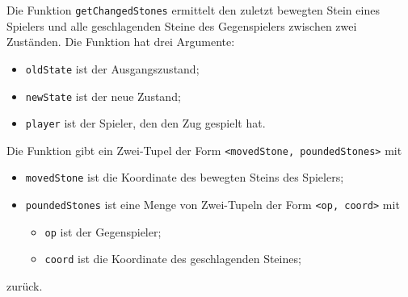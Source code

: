 \documentclass[11pt]{article}
\providecommand{\tightlist}{%
      \setlength{\itemsep}{0pt}\setlength{\parskip}{0pt}}
\begin{document}
    Die Funktion \texttt{getChangedStones} ermittelt den zuletzt bewegten
Stein eines Spielers und alle geschlagenden Steine des Gegenspielers
zwischen zwei Zuständen. Die Funktion hat drei Argumente:

\begin{itemize}
\tightlist
\item
  \texttt{oldState} ist der Ausgangszustand;
\item
  \texttt{newState} ist der neue Zustand;
\item
  \texttt{player} ist der Spieler, den den Zug gespielt hat.
\end{itemize}

Die Funktion gibt ein Zwei-Tupel der Form
\texttt{\textless{}movedStone,\ poundedStones\textgreater{}} mit

\begin{itemize}
\tightlist
\item
  \texttt{movedStone} ist die Koordinate des bewegten Steins des
  Spielers;
\item
  \texttt{poundedStones} ist eine Menge von Zwei-Tupeln der Form
  \texttt{\textless{}op,\ coord\textgreater{}} mit

  \begin{itemize}
  \tightlist
  \item
    \texttt{op} ist der Gegenspieler;
  \item
    \texttt{coord} ist die Koordinate des geschlagenden Steines;
  \end{itemize}
\end{itemize}

zurück.
\end{document}
